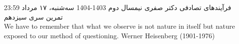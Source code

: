 \documentclass[11pt, a4, twoside]{article}
\begin{document}
	\pagestyle{empty}
	\heading
	{فرآیندهای تصادفی}
	{دکتر صفری}
	{نیمسال دوم 1403-1404}
    {سه‌شنبه، ۱۷ مرداد 23:59}
    {تمرین سری سیزدهم}
	\inspiringQuotation
	{\\We have to remember that what we observe is not nature in itself but nature exposed to our method of questioning.}
	{Werner Heisenberg (1901-1976)}
		\begin{problem}
		
		\end{problem}

		\begin{problem}
			
		\end{problem}

		\begin{problem}
			
		\end{problem}
\end{document}
